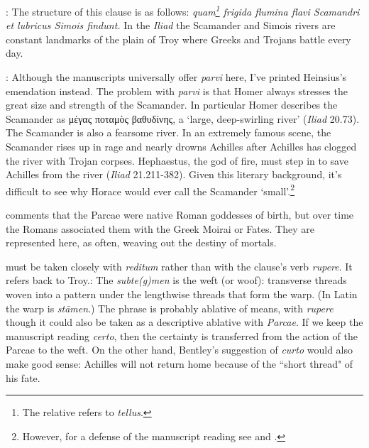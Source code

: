 
: The structure of this clause is as follows:
\textit{quam\footnote{The relative refers to \textit{tellus}.} frigida flumina
flavi Scamandri et lubricus Simois findunt.}  In the \textit{Iliad} the
Scamander and Simois rivers are constant landmarks of the plain of Troy where
Greeks and Trojans battle every day.


: Although the manuscripts universally offer \textit{parvi} here,
I've printed Heinsius's emendation instead.  The problem with \textit{parvi} is
that Homer always stresses the great size and strength of the Scamander. In
particular Homer describes the Scamander as μέγας ποταμὸς βαθυδίνης, a `large,
deep-swirling river' (\textit{Iliad} 20.73).  The Scamander is also a fearsome
river. In an extremely famous scene, the Scamander rises up in rage and nearly
drowns Achilles after Achilles has clogged the river with Trojan corpses.
Hephaestus, the god of fire, must step in to save Achilles from the river
(\textit{Iliad} 21.211-382).  Given this literary background, it's difficult to
see why Horace would ever call the Scamander `small'.\footnote{However, for
a defense of the manuscript reading see \citet[223--224]{mankin1995} and
\citet[207--209]{gaskin2013}.}


\citet[224--225]{mankin1995} comments that the Parcae were native Roman
goddesses of birth, but over time the Romans associated them with the Greek
Moirai or Fates.  They are represented here, as often, weaving out the destiny
of mortals.


 must be taken closely with \textit{reditum} rather than with the
clause's verb \textit{rupere}.  It refers back to Troy.\indent{}: The \textit{subte(g)men} is the weft (or woof): transverse threads
woven into a pattern under the lengthwise threads that form the warp.  (In
Latin the warp is \textit{stāmen}.)  The phrase is probably ablative of means,
with \textit{rupere} though it could also be taken as a descriptive ablative
with \textit{Parcae}.  If we keep the manuscript reading \textit{certo}, then
the certainty is transferred from the action of the Parcae to the weft.  On the
other hand, Bentley's suggestion of \textit{curto} would also make good sense:
Achilles will not return home because of the ``short thread" of his fate.

